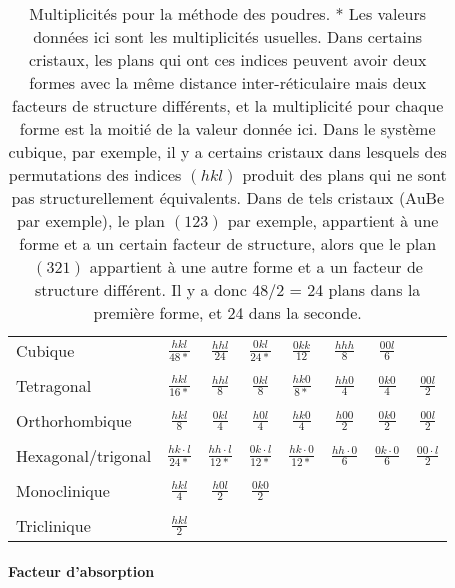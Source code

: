\begin{table*}
    \begin{tabularx}{\textwidth}{lCCCCCCC}
        \toprule
        Cubique & $\frac{hkl}{48*}$ & $\frac{hhl}{24}$ & $\frac{0kl}{24*}$ & $\frac{0kk}{12}$ & $\frac{hhh}{8}$ & $\frac{00l}{6}$ & \\
         &  &  &  &  &  & & \\
        Tetragonal & $\frac{hkl}{16*}$ & $\frac{hhl}{8}$ & $\frac{0kl}{8}$ & $\frac{hk0}{8*}$ & $\frac{hh0}{4}$ & $\frac{0k0}{4}$& $\frac{00l}{2}$\\
         &  &  &  &  &  & & \\
        Orthorhombique & $\frac{hkl}{8}$ & $\frac{0kl}{4}$ & $\frac{h0l}{4}$ & $\frac{hk0}{4}$ & $\frac{h00}{2}$ & $\frac{0k0}{2}$& $\frac{00l}{2}$\\
         &  &  &  &  &  & & \\
        Hexagonal/trigonal & $\frac{hk\cdot l}{24*}$ & $\frac{hh \cdot l}{12*}$ & $\frac{0k\cdot l}{12*}$ & $\frac{hk\cdot 0}{12*}$ & $\frac{hh\cdot 0}{6}$ & $\frac{0k \cdot 0}{6}$& $\frac{00\cdot l}{2}$\\
         &  &  &  &  &  & & \\
        Monoclinique & $\frac{hkl}{4}$ & $\frac{h0l}{2}$ & $\frac{0k0}{2}$ &  &  & & \\
         &  &  &  &  &  & & \\
        Triclinique & $\frac{hkl}{2}$ &  &  &  &  & & \\
        \bottomrule
    \end{tabularx}
    \label{tab:multiplicites}
    \caption{Multiplicités pour la méthode des poudres.
    \footnotesize{* Les valeurs données ici sont les multiplicités usuelles. Dans certains cristaux, les plans qui ont ces indices peuvent avoir deux formes avec la même distance inter-réticulaire mais deux facteurs de structure différents, et la multiplicité pour chaque forme est la moitié de la valeur donnée ici. Dans le système cubique, par exemple, il y a certains cristaux dans lesquels des permutations des indices $(hkl)$ produit des plans qui ne sont pas structurellement équivalents. Dans de tels cristaux (AuBe par exemple), le plan $(123)$ par exemple, appartient à une forme et a un certain facteur de structure, alors que le plan $(321)$ appartient à une autre forme et a un facteur de structure différent. Il y a donc 48/2 = 24 plans dans la première forme, et 24 dans la seconde.}}
\end{table*}

\paragraph{Facteur d'absorption}

